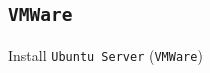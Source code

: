 \documentclass{beamer}
\begin{document}
\subsection{\texttt{VMWare}}
\begin{frame}{Install \texttt{Ubuntu Server} (\texttt{VMWare})}
  \begin{center}
    \begin{figure}
      \begin{overprint}
        \setlength{\fboxsep}{0pt}%
        \setlength{\fboxrule}{0.5pt}%
        \centering{}
        \centering{}
        \centering{}

\end{overprint}
\end{figure}
\end{center}
\end{frame}
\end{document}
